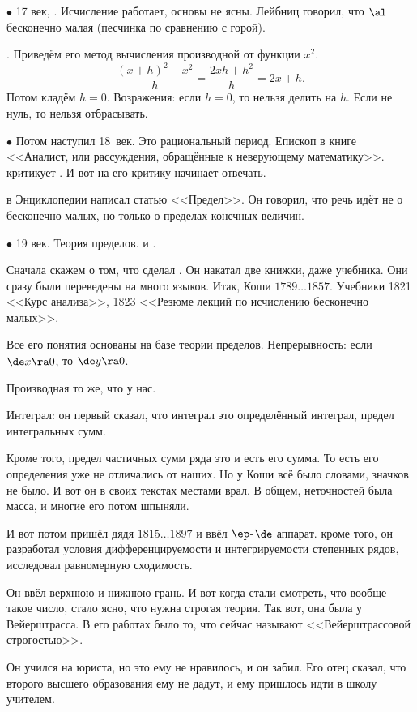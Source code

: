 \documentclass[a4paper,oneside,fleqn,10pt]{article}
\newcommand{\pe}[2]{${#1}\ldots{#2}$}
\begin{document}
$\bullet$ 17 век, . Исчисление работает, основы не
ясны. Лейбниц говорил, что $\al$ бесконечно малая (песчинка по
сравнению с горой).

. Приведём его метод вычисления производной от функции
$x^2$.
$$\frac{(x+h)^2 - x^2}{h} = \frac{2xh + h^2}{h} = 2x + h.$$ Потом
кладём $h = 0$. Возражения: если $h = 0$, то нельзя делить на
$h$. Если не нуль, то нельзя отбрасывать.

$\bullet$ Потом наступил 18~век. Это рациональный период. Епископ
 в книге <<Аналист, или рассуждения, обращённые к
неверующему математику>>.  критикует . И вот на
его критику начинает отвечать.

 в Энциклопедии написал статью <<Предел>>. Он говорил,
что речь идёт не о бесконечно малых, но только о пределах конечных
величин.

$\bullet$ 19 век. Теория пределов.  и .

Сначала скажем о том, что сделал .  Он накатал две книжки,
даже учебника. Они сразу были переведены на много языков. Итак, Коши
\pe{1789}{1857}. Учебники 1821 <<Курс анализа>>, 1823 <<Резюме лекций
по исчислению бесконечно малых>>.

Все его понятия основаны на базе теории пределов.  Непрерывность: если
$\de x \ra 0$, то $\de y \ra 0$.

Производная то же, что у нас.

Интеграл: он первый сказал, что интеграл это определённый интеграл,
предел интегральных сумм.

Кроме того, предел частичных сумм ряда это и есть его сумма. То есть
его определения уже не отличались от наших. Но у Коши всё было
словами, значков не было.  И вот он в своих текстах местами врал. В
общем, неточностей была масса, и многие его потом шпыняли.

И вот потом пришёл дядя  \pe{1815}{1897} и ввёл
$\ep$-$\de$ аппарат.  кроме того, он разработал условия
дифференцируемости и интегрируемости степенных рядов, исследовал
равномерную сходимость.

Он ввёл верхнюю и нижнюю грань. И вот когда стали смотреть, что вообще
такое число, стало ясно, что нужна строгая теория. Так вот, она была у
Вейерштрасса. В его работах было то, что сейчас называют
<<Вейерштрассовой строгостью>>.

Он учился на юриста, но это ему не нравилось, и он забил.  Его отец
сказал, что второго высшего образования ему не дадут, и ему пришлось
идти в школу учителем.
\end{document}
